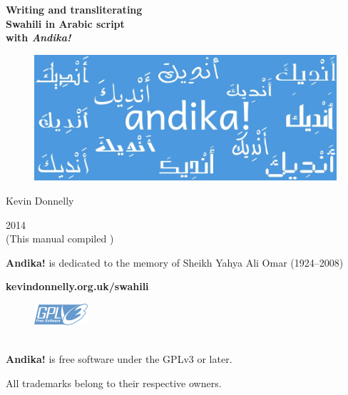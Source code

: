 \begin{titlepage}
\begin{center}

{\Huge\textbf{Writing and transliterating}}\\[0.5cm]
{\Huge\textbf{Swahili in Arabic script}}\\[0.5cm]
{\Huge\textbf{with \textit{Andika!}}}

\vspace{2cm}

\begin{figure}[h]
 \centering
 \includegraphics[keepaspectratio=true, scale=0.6]{../images/andika_960.jpg}
\end{figure}
\vspace{2cm}

{\LARGE{Kevin Donnelly}}
\vspace{2cm}

{\Large{2014}}\\
(This manual compiled \todayuk)

\vspace{2cm}
\textbf{Andika!} is dedicated to the memory of Sheikh Yahya Ali Omar (1924--2008)

\textbf{kevindonnelly.org.uk/swahili}
\begin{figure}[H]
 \centering
 \includegraphics[keepaspectratio=true, scale=0.1]{../images/gpl3_blue.png}
\end{figure}\\
\textbf{Andika!} is free software under the GPLv3 or later.

All trademarks belong to their respective owners.

\end{center}
\end{titlepage}


\tableofcontents  %
\listoffigures
\listoftables

